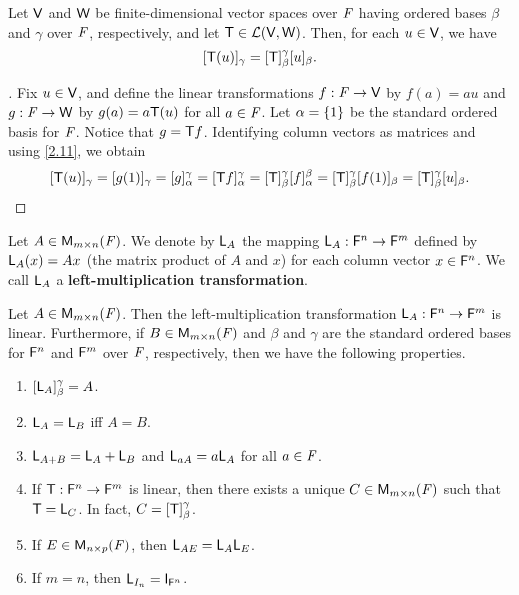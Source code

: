 \begin{thm}\label{2.14}
	Let \(\mathsf{V}\) and \(\mathsf{W}\) be finite-dimensional vector spaces over \(\mathit{F}\) having ordered bases \(\beta\) and \(\gamma\) over \(\mathit{F}\), respectively, and let \(\mathsf{T} \in \mathcal{L}(\mathsf{V}, \mathsf{W})\).
	Then, for each \(u \in \mathsf{V}\), we have
	\[
		[\mathsf{T}(u)]_{\gamma} = [\mathsf{T}]_{\beta}^{\gamma} [u]_{\beta}.
	\]
\end{thm}

\begin{proof}[]
	Fix \(u \in \mathsf{V}\), and define the linear transformations \(f : \mathit{F} \to \mathsf{V}\) by \(f(a) = au\) and \(g : \mathit{F} \to \mathsf{W}\) by \(g(a) = a \mathsf{T}(u)\) for all \(a \in \mathit{F}\).
	Let \(\alpha = \left\lbrace1\right\rbrace\) be the standard ordered basis for \(\mathit{F}\).
	Notice that \(g = \mathsf{T} f\).
	Identifying column vectors as matrices and using \cref{2.11}, we obtain
	\[
		[\mathsf{T}(u)]_{\gamma} = [g(1)]_{\gamma} = [g]_{\alpha}^{\gamma} = [\mathsf{T} f]_{\alpha}^{\gamma} = [\mathsf{T}]_{\beta}^{\gamma} [f]_{\alpha}^{\beta} = [\mathsf{T}]_{\beta}^{\gamma} [f(1)]_{\beta} = [\mathsf{T}]_{\beta}^{\gamma} [u]_{\beta}.
	\]
\end{proof}

\begin{defn}\label{2.3.8}
	Let \(A \in \ms[m][n][\F]\).
	We denote by \(\mathsf{L}_A\) the mapping \(\mathsf{L}_A : \mathsf{F}^n \to \mathsf{F}^m\) defined by \(\mathsf{L}_A(x) = Ax\) (the matrix product of \(A\) and \(x\)) for each column vector \(x \in \mathsf{F}^n\).
	We call \(\mathsf{L}_A\) a \textbf{left-multiplication transformation}.
\end{defn}

\begin{thm}\label{2.15}
	Let \(A \in \ms\).
	Then the left-multiplication transformation \(\mathsf{L}_A : \mathsf{F}^n \to \mathsf{F}^m\) is linear.
	Furthermore, if \(B \in \ms\) and \(\beta\) and \(\gamma\) are the standard ordered bases for \(\mathsf{F}^n\) and \(\mathsf{F}^m\) over \(\mathit{F}\), respectively, then we have the following properties.
	\begin{enumerate}
		\item \([\mathsf{L}_A]_{\beta}^{\gamma} = A\).
		\item \(\mathsf{L}_A = \mathsf{L}_B\) iff \(A = B\).
		\item \(\mathsf{L}_{A + B} = \mathsf{L}_A + \mathsf{L}_B\) and \(\mathsf{L}_{aA} = a \mathsf{L}_A\) for all \(a \in \mathit{F}\).
		\item If \(\mathsf{T} : \mathsf{F}^n \to \mathsf{F}^m\) is linear, then there exists a unique \(C \in \ms\) such that \(\mathsf{T} = \mathsf{L}_C\).
		      In fact, \(C = [\mathsf{T}]_{\beta}^{\gamma}\).
		\item If \(E \in \ms[n][p][\F]\), then \(\mathsf{L}_{AE} = \mathsf{L}_A \mathsf{L}_E\).
		\item If \(m = n\), then \(\L_{I_n} = \IT[\vs{F}^n]\).
	\end{enumerate}
\end{thm}

